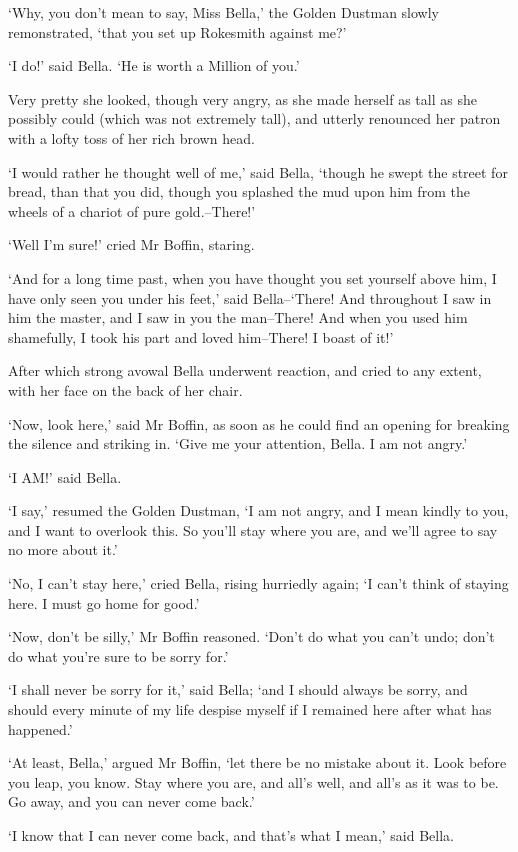 ‘Why, you don’t mean to say, Miss Bella,’ the Golden Dustman slowly
remonstrated, ‘that you set up Rokesmith against me?’

‘I do!’ said Bella. ‘He is worth a Million of you.’

Very pretty she looked, though very angry, as she made herself as
tall as she possibly could (which was not extremely tall), and utterly
renounced her patron with a lofty toss of her rich brown head.

‘I would rather he thought well of me,’ said Bella, ‘though he swept the
street for bread, than that you did, though you splashed the mud upon
him from the wheels of a chariot of pure gold.--There!’

‘Well I’m sure!’ cried Mr Boffin, staring.

‘And for a long time past, when you have thought you set yourself above
him, I have only seen you under his feet,’ said Bella--‘There! And
throughout I saw in him the master, and I saw in you the man--There! And
when you used him shamefully, I took his part and loved him--There! I
boast of it!’

After which strong avowal Bella underwent reaction, and cried to any
extent, with her face on the back of her chair.

‘Now, look here,’ said Mr Boffin, as soon as he could find an opening
for breaking the silence and striking in. ‘Give me your attention,
Bella. I am not angry.’

‘I AM!’ said Bella.

‘I say,’ resumed the Golden Dustman, ‘I am not angry, and I mean kindly
to you, and I want to overlook this. So you’ll stay where you are, and
we’ll agree to say no more about it.’

‘No, I can’t stay here,’ cried Bella, rising hurriedly again; ‘I can’t
think of staying here. I must go home for good.’

‘Now, don’t be silly,’ Mr Boffin reasoned. ‘Don’t do what you can’t
undo; don’t do what you’re sure to be sorry for.’

‘I shall never be sorry for it,’ said Bella; ‘and I should always be
sorry, and should every minute of my life despise myself if I remained
here after what has happened.’

‘At least, Bella,’ argued Mr Boffin, ‘let there be no mistake about it.
Look before you leap, you know. Stay where you are, and all’s well, and
all’s as it was to be. Go away, and you can never come back.’

‘I know that I can never come back, and that’s what I mean,’ said Bella.

